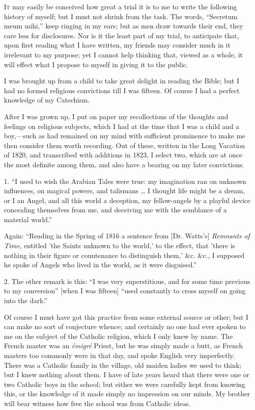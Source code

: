 
I\textsc{t} may easily be
conceived how great a trial it is to me to write the following history
of myself; but I must not shrink from the task. The words, ``Secretum
meum mihi,'' keep ringing in my ears; but as men draw towards
their end, they care less for disclosures. Nor is it the least part of
my trial, to anticipate that, upon first reading what
I have written, my friends may consider much in it irrelevant
to my purpose; yet I cannot help thinking that, viewed as a whole, it
will effect what I propose to myself in giving
it to the public.

I was brought up from a child to take great delight in reading the
Bible; but I had no formed religious convictions till I was fifteen.
Of course I had a perfect knowledge of my Catechism.

After I was grown up, I put on paper my recollections of the thoughts and feelings on religious subjects,
which I
had at the time that I was a child and a boy,—such as had
remained on my mind with sufficient prominence to make me then
consider them worth recording. Out of these, written in the
Long Vacation of 1820, and transcribed with additions in 1823, I
select two, which are at once the most definite among them, and also
have a bearing on my later convictions.

1. ``I used to wish the Arabian Tales were true: my imagination ran on
unknown influences, on magical powers, and talismans … I thought
life might be a dream, or I an Angel, and all this world a deception,
my fellow-angels by a playful device concealing themselves from me,
and deceiving me with the semblance of a material world.''

Again: ``Reading in the Spring of 1816 a sentence from [Dr.
Watts's] \emph{Remnants of Time}, entitled 'the Saints unknown to the
world,' to the effect, that 'there is nothing in their figure or
countenance to distinguish them,' \&c. \&c., I supposed he spoke
of Angels who lived in the world, as it were disguised.''

2. The other remark is this: ``I was very
superstitious, and for some time previous to my conversion'' [when
I was fifteen] ``used constantly to cross myself on going into the
dark.''

Of course I must have got this practice from some external source
or other; but I can make no sort of conjecture whence; and certainly
no one had ever spoken to me on the subject of the Catholic religion,
which I only knew by name. The French master was an \emph{émigré}
Priest, but he was simply made a butt, as French masters too commonly
were in that day, and spoke English very imperfectly. There was a
Catholic family in the village, old maiden ladies we used to think;
but I knew nothing about them. I have of late years heard that there were one or two Catholic
boys in the school; but either we were carefully kept from knowing
this, or the knowledge of it made simply no impression on our minds.
My brother will bear witness how free the school was from Catholic
ideas.

